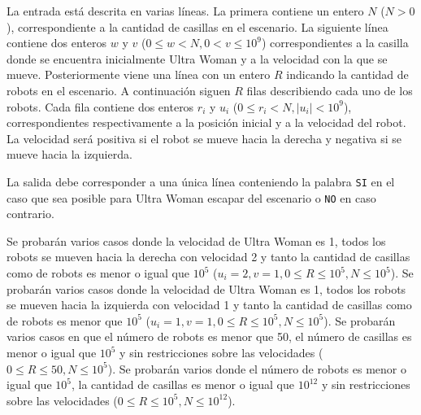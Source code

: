 \documentclass{oci}
\begin{document}
\begin{inputDescription}
  La entrada está descrita en varias líneas.
  La primera contiene un entero $N$ ($N>0$), correspondiente a la cantidad de
  casillas en el escenario.
  La siguiente línea contiene dos enteros $w$ y $v$ ($0\leq w< N, 0<v\leq 10^9$)
  correspondientes a la casilla donde se encuentra inicialmente Ultra Woman y a la
  velocidad con la que se mueve.
  Posteriormente viene una línea con un entero $R$ indicando la cantidad de
  robots en el escenario.
  A continuación siguen $R$ filas describiendo cada uno de los robots.
  Cada fila contiene dos enteros $r_i$ y $u_i$ ($0\leq r_i < N, |u_i|< 10^9$),
  correspondientes respectivamente a la posición inicial y a la velocidad del
  robot.
  La velocidad será positiva si el robot se mueve hacia la derecha y negativa si
  se mueve hacia la izquierda.
\end{inputDescription}

\begin{outputDescription}
La salida debe corresponder a una única línea conteniendo la palabra \texttt{SI}
en el caso que sea posible para Ultra Woman escapar del escenario o \texttt{NO}
en caso contrario.
\end{outputDescription}

\begin{scoreDescription}
   Se probarán varios casos donde la velocidad de Ultra Woman es 1,
  todos los robots se mueven hacia la derecha con velocidad 2 y tanto la
  cantidad de casillas como de robots es menor o igual que $10^5$ ($u_i=2, v=1,
  0\leq R\leq 10^5, N\leq 10^5$).
   Se probarán varios casos donde la velocidad de Ultra Woman es 1,
  todos los robots se mueven hacia la izquierda con velocidad 1 y tanto la cantidad
  de casillas como de robots es menor que $10^5$ ($u_i=1, v=1, 0\leq R\leq 10^5,
  N\leq 10^5$).
   Se probarán varios casos en que el número de robots es menor que
  50, el número de casillas es menor o igual que $10^5$ y sin restricciones sobre las
  velocidades ($0\leq R\leq 50, N\leq 10^5$).
   Se probarán varios donde el número de robots es menor o igual que
  $10^5$, la cantidad de casillas es menor o igual que $10^{12}$ y sin
  restricciones sobre las velocidades ($0\leq R\leq 10^5, N \leq10^{12}$).
\end{scoreDescription}

\begin{sampleDescription}
\end{sampleDescription}
\end{document}
